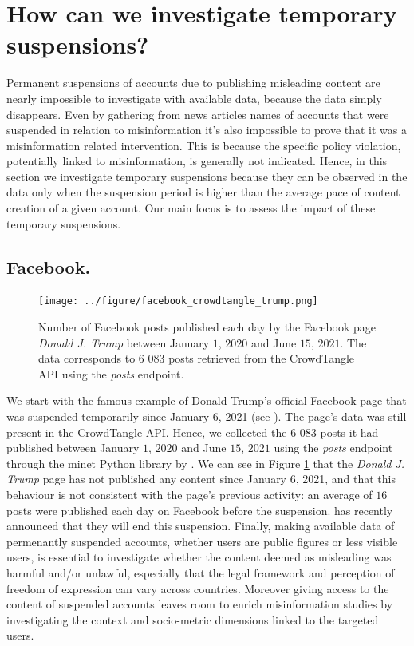 \documentclass[Afour,sageh,times]{sagej}
\begin{document}
\section{How can we investigate temporary suspensions?}

Permanent suspensions of accounts due to publishing misleading content are nearly impossible to investigate with available data, because the data simply disappears. 
Even by gathering from news articles names of accounts that were suspended in relation to misinformation it's also impossible to prove that it was a misinformation related intervention. 
This is because the specific policy violation, potentially linked to misinformation, is generally not indicated. 
Hence, in this section we investigate temporary suspensions because they can be observed in the data only when the suspension period is higher than the average pace of content creation of a given account. 
Our main focus is to assess the impact of these temporary suspensions. 

\subsection{Facebook.} 

\begin{figure}[h]
	\centering
			\texttt{[image: ../figure/facebook\_crowdtangle\_trump.png]}
	\caption{Number of Facebook posts published each day by the Facebook page {\it Donald J. Trump} between January $1$, $2020$ and June $15$, $2021$. The data corresponds to $6$ $083$ posts retrieved from the CrowdTangle API using the {\it posts} endpoint.}
	\label{fig1_fb}
\end{figure}
We start with the famous example of  Donald Trump’s official \href{https://www.facebook.com/DonaldTrump/}{Facebook page} that was suspended temporarily since January 6, 2021 (see \cite{facebookzuck}). 
The page’s data was still present in the CrowdTangle API. 
Hence, we collected the $6$ $083$ posts it had published between January $1$, $2020$ and June $15$, $2021$ using the {\it posts} endpoint through the minet Python library by \cite{minet} . 
We can see in Figure \ref{fig1_fb} that the {\it Donald J. Trump} page has not published any content since January $6$, 2021, and that this behaviour is not consistent with the page’s previous activity: an average of $16$ posts were published each day on Facebook before the suspension. 
\cite{facebooktrump} has recently announced that they will end this suspension. 
Finally, making available data of permenantly suspended accounts, whether users are public figures or less visible users, is essential to investigate whether the content deemed as misleading was harmful and/or unlawful, especially that the legal framework and perception of freedom of expression can vary across countries. Moreover giving access to the content of suspended accounts leaves room to enrich misinformation studies by investigating the context and socio-metric dimensions linked to the targeted users.  
\end{document}

